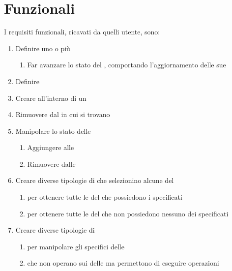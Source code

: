 \section{Funzionali}\label{sec:funzionali}
I requisiti funzionali, ricavati da quelli utente, sono:
\begin{enumerate}[label=\textbf{\ref{sec:funzionali}.\arabic*}]
    \item \label{itm:f1} Definire uno o più \World
    \begin{enumerate}[label=\textbf{\ref{itm:f1}.\arabic*}]
        \item \label{itm:ff2} Far avanzare lo stato del \World, comportando l'aggiornamento delle sue \Entity
    \end{enumerate}
    \item \label{itm:f2} Definire \Component
    \item \label{itm:f3} Creare \Entity all'interno di un \World
    \item \label{itm:f4} Rimuovere \Entity dal \World in cui si trovano
    \item \label{itm:f5} Manipolare lo stato delle \Entity
    \begin{enumerate}[label=\textbf{\ref{itm:f5}.\arabic*}]
        \item \label{itm:ff3} Aggiungere \Component alle \Entity
        \item \label{itm:ff4} Rimuovere \Component dalle \Entity
    \end{enumerate}
    \item \label{itm:f6} Creare diverse tipologie di \View che selezionino alcune \Entity del \World
    \begin{enumerate}[label=\textbf{\ref{itm:f6}.\arabic*}]
        \item \label{itm:ff5} \View per ottenere tutte le \Entity del \World che possiedono i \Component specificati
        \item \label{itm:ff6} \View per ottenere tutte le \Entity del \World che non possiedono nessuno dei \Component
        specificati
    \end{enumerate}
    \item \label{itm:f7} Creare diverse tipologie di \System
    \begin{enumerate}[label=\textbf{\ref{itm:f7}.\arabic*}]
        \item \label{itm:ff7} \System per manipolare gli specifici \Component delle \Entity
        \item \label{itm:ff10} \System che non operano sui \Component delle \Entity ma permettono di eseguire operazioni

\end{enumerate}
\end{enumerate}
